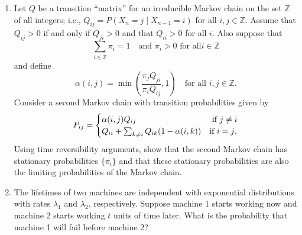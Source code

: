 \documentclass{article}
\begin{document}
\begin{enumerate}
\item Let $Q$ be a transition ``matrix'' for an irreducible Markov chain on the
set $\mathbb{Z}$ of all integers; i.e., $Q_{ij}=P(X_n=j \mid X_{n-1}=i)$ for all
$i,j\in\mathbb{Z}$. Assume that $Q_{ij}>0$ if and only if $Q_{ji}>0$ and that
$Q_{ii}>0$ for all $i$. Also suppose that
\[
\sum_{i \in \mathbb{Z}} \pi_i = 1 \quad \mbox{and $\pi_i>0$ for all
$i\in\mathbb{Z}$}
\]
and define
\[
\alpha(i,j) = \min\left(\frac{\pi_jQ_{ji}}{\pi_iQ_{ij}}, 1\right) \quad\mbox{for
all $i,j\in\mathbb{Z}$.}
\]
Consider a second Markov chain with transition probabilities given by
\[
P_{ij} =  
  \begin{cases}
  \alpha(i,j) Q_{ij} &  \mbox{ if  $ j \neq i$}  \\
  Q_{ii} + \sum_{k\neq i} Q_{ik}(1-\alpha(i,k)) & \mbox{if $i=j$,}
  \end{cases}
\]
Using time reversibility arguments, show that the second Markov chain has
stationary probabilities $\{\pi_i\}$ and that these stationary probabilities are
also the limiting probabilities of the Markov chain.

\item The lifetimes of two machines are independent with exponential
distributions with rates $\lambda_1$ and $\lambda_2$, respectively. Suppose
machine 1 starts working now and machine 2 starts working $t$ units of time
later. What is the probability that machine 1 will fail before machine 2?

\end{enumerate}
\end{document}
